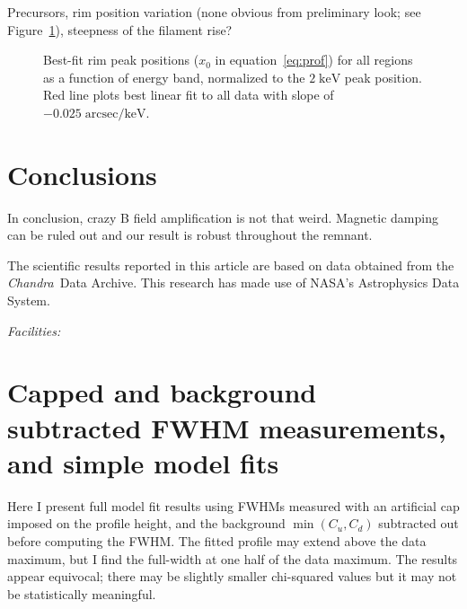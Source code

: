\documentclass[iop, apj, numberedappendix, twocolappendix]{emulateapj}
\newcommand*{\mt}{\mathrm}
\newcommand*{\unit}[1]{\;\mt{#1}}  %
\newcommand*{\Chandra}{\textit{Chandra}\ }
\begin{document}
Precursors, rim position variation (none obvious from preliminary look; see
Figure~\ref{fig:peak-pos}), steepness of the filament rise?

\begin{figure}[ht]
    \centering
    \caption{Best-fit rim peak positions ($x_0$ in equation~\eqref{eq:prof})
        for all regions as a function of energy band, normalized to the $2
        \unit{keV}$ peak position.  Red line plots best linear fit to all data
        with slope of $-0.025 \unit{arcsec/keV}$.
        \label{fig:peak-pos}}
\end{figure}

\section{Conclusions}

In conclusion, crazy B field amplification is not that weird.
Magnetic damping can be ruled out and our result is robust throughout the remnant.

\acknowledgments

The scientific results reported in this article are based on data obtained from
the \Chandra Data Archive.
This research has made use of NASA's Astrophysics Data System.

{\it Facilities:} 

\clearpage

\appendix

\setcounter{table}{0}
\renewcommand{\thetable}{A\arabic{table}}
\setcounter{figure}{0}
\renewcommand{\thefigure}{A\arabic{figure}}

\section{Capped and background subtracted FWHM measurements, and simple model
fits}

Here I present full model fit results using FWHMs measured with an artificial
cap imposed on the profile height, and the background $\min(C_u, C_d)$
subtracted out before computing the FWHM.  The fitted profile may extend above
the data maximum, but I find the full-width at one half of the data maximum.
The results appear equivocal; there may be slightly smaller chi-squared values
but it may not be statistically meaningful.
\end{document}
